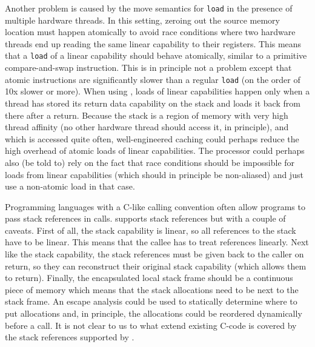 Another problem is caused by the move semantics for \texttt{load} in the presence of multiple hardware threads.
In this setting, zeroing out the source memory location must happen atomically to avoid race conditions where two hardware threads end up reading the same linear capability to their registers.
This means that a \texttt{load} of a linear capability should behave atomically, similar to a primitive compare-and-swap instruction.
This is in principle not a problem except that atomic instructions are significantly slower than a regular \texttt{load} (on the order of 10x slower or more).
When using \stktokens{}, loads of linear capabilities happen only when a thread has stored its return data capability on the stack and loads it back from there after a return.
Because the stack is a region of memory with very high thread affinity (no other hardware thread should access it, in principle), and which is accessed quite often, well-engineered caching could perhaps reduce the high overhead of atomic loads of linear capabilities.
The processor could perhaps also (be told to) rely on the fact that race conditions should be impossible for loads from linear capabilities (which should in principle be non-aliased) and just use a non-atomic load in that case.

\begin{jversion}
  Programming languages with a C-like calling convention often allow programs to pass stack references in calls.
  \stkotkens{} supports stack references but with a couple of caveats.
  First of all, the stack capability is linear, so all references to the stack have to be linear.
  This means that the callee has to treat references linearly.
  Next like the stack capability, the stack references must be given back to the caller on return, so they can reconstruct their original stack capability (which allows them to return). 
  Finally, the encapsulated local stack frame should be a continuous piece of memory which means that the stack allocations need to be next to the stack frame.
  An escape analysis could be used to statically determine where to put allocations and, in principle, the allocations could be reordered dynamically before a call.
  It is not clear to us to what extend existing C-code is covered by the stack references supported by \stktokens{}.
\end{jversion}


